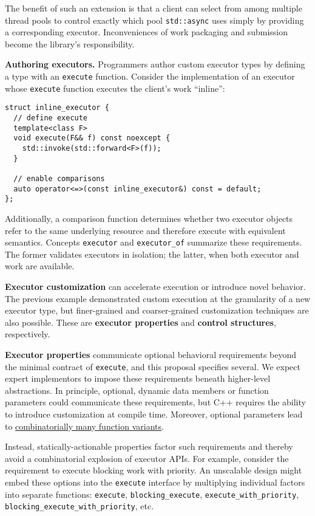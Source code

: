 \documentclass[a4paper,12pt,notitlepage,twoside,openright]{article}
\begin{document}
The benefit of such an extension is that a client can select from among
multiple thread pools to control exactly which pool
\texttt{std::async} uses simply by providing a corresponding
executor. Inconveniences of work packaging and submission become the
library's responsibility.

\textbf{Authoring executors.} Programmers author custom executor types
by defining a type with an \texttt{execute} function.
Consider the implementation of an executor whose
\texttt{execute} function executes the client's work
``inline'':

\begin{verbatim}
struct inline_executor {
  // define execute
  template<class F>
  void execute(F&& f) const noexcept {
    std::invoke(std::forward<F>(f));
  }

  // enable comparisons
  auto operator<=>(const inline_executor&) const = default;
};
\end{verbatim}

Additionally, a comparison function determines whether two executor
objects refer to the same underlying resource and therefore execute with
equivalent semantics. Concepts \texttt{executor} and
\texttt{executor_of} summarize these requirements. The
former validates executors in isolation; the latter, when both executor
and work are available.

\textbf{Executor customization} can accelerate execution or introduce
novel behavior. The previous example demonstrated custom execution at
the granularity of a new executor type, but finer-grained and
coarser-grained customization techniques are also possible. These are
\textbf{executor properties} and \textbf{control structures},
respectively.

\textbf{Executor properties} communicate optional behavioral
requirements beyond the minimal contract of
\texttt{execute}, and this proposal specifies several. We
expect expert implementors to impose these requirements beneath
higher-level abstractions. In principle, optional, dynamic data members
or function parameters could communicate these requirements, but C++
requires the ability to introduce customization at compile time.
Moreover, optional parameters lead to
\href{https://wg21.link/P2033}{combinatorially many function variants}.

Instead, statically-actionable properties factor such requirements and
thereby avoid a combinatorial explosion of executor APIs. For example,
consider the requirement to execute blocking work with priority. An
unscalable design might embed these options into the
\texttt{execute} interface by multiplying individual factors
into separate functions: \texttt{execute},
\texttt{blocking_execute},
\texttt{execute_with_priority},
\texttt{blocking_execute_with_priority}, etc.
\end{document}
